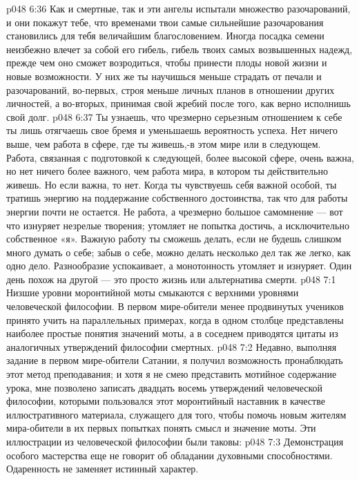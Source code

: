 \vs p048 6:36 Как и смертные, так и эти ангелы испытали множество разочарований, и они покажут тебе, что временами твои самые сильнейшие разочарования становились для тебя величайшим благословением. Иногда посадка семени неизбежно влечет за собой его гибель, гибель твоих самых возвышенных надежд, прежде чем оно сможет возродиться, чтобы принести плоды новой жизни и новые возможности. У них же ты научишься меньше страдать от печали и разочарований, во\hyp{}первых, строя меньше личных планов в отношении других личностей, а во\hyp{}вторых, принимая свой жребий после того, как верно исполнишь свой долг.
\vs p048 6:37 Ты узнаешь, что чрезмерно серьезным отношением к себе ты лишь отягчаешь свое бремя и уменьшаешь вероятность успеха. Нет ничего выше, чем работа в сфере, где ты живешь,\hyp{}в этом мире или в следующем. Работа, связанная с подготовкой к следующей, более высокой сфере, очень важна, но нет ничего более важного, чем работа мира, в котором ты действительно живешь. Но если  важна, то  нет. Когда ты чувствуешь себя важной особой, ты тратишь энергию на поддержание собственного достоинства, так что для работы энергии почти не остается. Не работа, а чрезмерно большое самомнение --- вот что изнуряет незрелые творения; утомляет не попытка достичь, а исключительно собственное «я». Важную работу ты сможешь делать, если не будешь слишком много думать о себе; забыв о себе, можно делать несколько дел так же легко, как одно дело. Разнообразие успокаивает, а монотонность утомляет и изнуряет. Один день похож на другой --- это просто жизнь или альтернатива смерти.
\vs p048 7:1 Низшие уровни моронтийной моты смыкаются с верхними уровнями человеческой философии. В первом мире\hyp{}обители менее продвинутых учеников принято учить на параллельных примерах, когда в одном столбце представлены наиболее простые понятия значений моты, а в соседнем приводятся цитаты из аналогичных утверждений философии смертных.
\vs p048 7:2 Недавно, выполняя задание в первом мире\hyp{}обители Сатании, я получил возможность пронаблюдать этот метод преподавания; и хотя я не смею представить мотийное содержание урока, мне позволено записать двадцать восемь утверждений человеческой философии, которыми пользовался этот моронтийный наставник в качестве иллюстративного материала, служащего для того, чтобы помочь новым жителям мира\hyp{}обители в их первых попытках понять смысл и значение моты. Эти иллюстрации из человеческой философии были таковы:
\vs p048 7:3 \bibnobreakspace Демонстрация особого мастерства еще не говорит об обладании духовными способностями. Одаренность не заменяет истинный характер.

